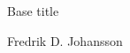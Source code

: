 \documentclass[11pt,a4paper]{article}
\begin{document}


\begin{center}
{\LARGE{Base title}}

\vspace{3mm}
{\Large Fredrik D. Johansson}
\vspace{3mm}
\end{center}







\end{document}

